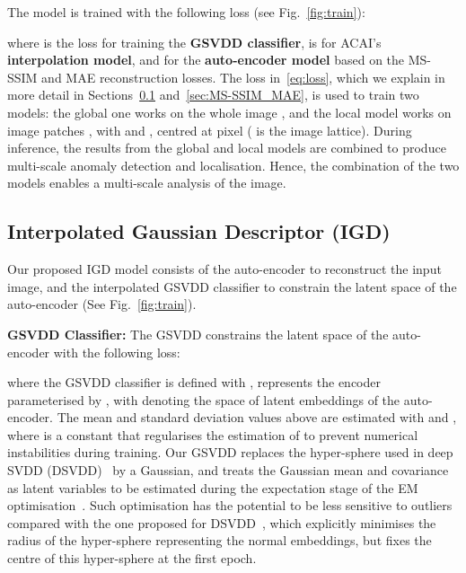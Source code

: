 \documentclass[final]{cvpr}
\begin{document}
The model is trained with the following loss (see Fig.~\ref{fig:train}):

where 
  is the loss for training the \textbf{GSVDD classifier},
 is for ACAI's \textbf{interpolation model}, and  for the \textbf{auto-encoder model} based on the MS-SSIM and MAE reconstruction losses.  
The loss in~\eqref{eq:loss}, which we explain in more detail in Sections~\ref{sec:IGD} and~\ref{sec:MS-SSIM_MAE}, is used to train two models: the global one works on the whole image , and the local model works on image patches , with  and , centred at pixel  ( is the image lattice).
During inference, the results from the global and local models are combined to produce multi-scale anomaly detection and localisation.
 Hence, the combination of the two models enables a multi-scale analysis of the image.






\subsection{Interpolated Gaussian Descriptor (IGD)}
\label{sec:IGD}





















Our proposed IGD model consists of the auto-encoder to reconstruct the input image, and the interpolated GSVDD classifier to constrain the latent space of the auto-encoder (See Fig.~\ref{fig:train}). 

\textbf{GSVDD Classifier:} The GSVDD constrains the latent space of the auto-encoder with the following loss:

where the GSVDD classifier is defined with ,  
 represents the encoder parameterised by , with  denoting the space of latent embeddings of the auto-encoder.  
The mean and standard deviation values above are estimated with  and , 
where  is a constant that regularises the estimation of  to prevent numerical instabilities during training. Our GSVDD replaces the hyper-sphere used in deep SVDD (DSVDD)~\cite{dsvdd} by a Gaussian, and treats the Gaussian mean and covariance as latent variables to be estimated during the expectation stage of the EM optimisation~\cite{dempster1977maximum}.  Such optimisation has the potential to be less sensitive to outliers compared with the one proposed for DSVDD~\cite{dsvdd}, which explicitly minimises the radius of the hyper-sphere representing the normal embeddings, but fixes the centre of this hyper-sphere at the first epoch. 
\end{document}

